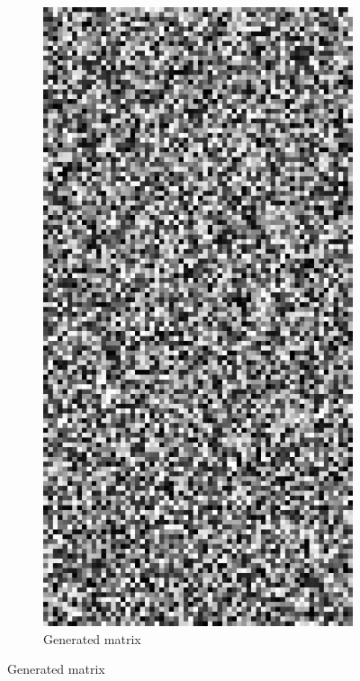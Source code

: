 \documentclass{llncs}
\begin{document}
\begin{figure}
\centering
\begin{subfigure}[t]{0.25\textwidth}
\centering
\includegraphics[scale=.9]{img/exp_input_2.png}
\caption{Generated matrix}
\label{fig:rila}
\end{subfigure}%

\end{figure}
\end{document}
